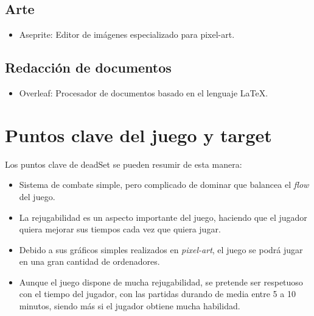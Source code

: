 \documentclass[12pt]{article}
\begin{document}
    \subsection{Arte}
        \begin{itemize}
            \item Aseprite: Editor de imágenes especializado para pixel-art. 
        \end{itemize}

    \subsection{Redacción de documentos}
        \begin{itemize}
            \item Overleaf: Procesador de documentos basado en el lenguaje LaTeX. 
        \end{itemize}


\section{Puntos clave del juego y target}
    Los puntos clave de \textunderscore deadSet se pueden resumir de esta manera: 
    \begin{itemize}
        \item Sistema de combate simple, pero complicado de dominar que balancea el \textit{flow} del juego.
        \item La rejugabilidad es un aspecto importante del juego, haciendo que el jugador quiera mejorar sus tiempos cada vez que quiera jugar. 
        \item Debido a sus gráficos simples realizados en \textit{pixel-art}, el juego se podrá jugar en una gran cantidad de ordenadores. 
        \item Aunque el juego dispone de mucha rejugabilidad, se pretende ser respetuoso con el tiempo del jugador, con las partidas durando de media entre 5 a 10 minutos, siendo más si el jugador obtiene mucha habilidad. 
    \end{itemize}
        
\end{document}
